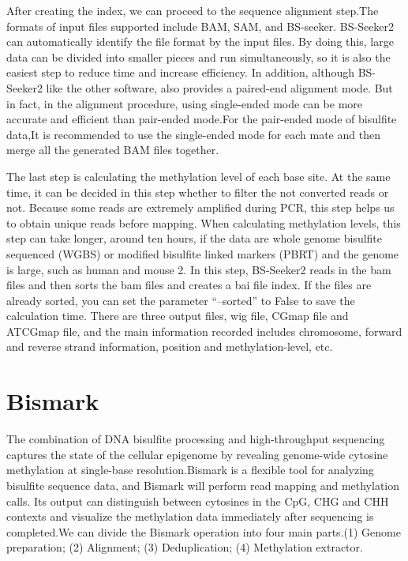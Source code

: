 \documentclass{PHlab-thesis}
\begin{document}
\par
After creating the index, we can proceed to the sequence alignment step.The formats of input files supported include BAM, SAM, and BS-seeker. BS-Seeker2 can automatically identify the file format by the input files. By doing this, large data can be divided into smaller pieces and run simultaneously, so it is also the easiest step to reduce time and increase efficiency. In addition, although BS-Seeker2 like the other software, also provides a paired-end alignment mode. But in fact, in the alignment procedure, using single-ended mode can be more accurate and efficient than pair-ended mode.For the pair-ended mode of bisulfite data,It is recommended to use the single-ended mode for each mate and then merge all the generated BAM files together.

\par
The last step is calculating the methylation level of each base site. At the same time, it can be decided in this step whether to filter the not converted reads or not. Because some reads are extremely amplified during PCR, this step helps us to obtain unique reads before mapping. When calculating methylation levels, this step can take longer, around ten hours, if the data are whole genome bisulfite sequenced (WGBS) or modified bisulfite linked markers (PBRT) and the genome is large, such as human and mouse {2}. In this step, BS-Seeker2 reads in the bam files and then sorts the bam files and creates a bai file index. If the files are already sorted, you can set the parameter “–sorted” to False to save the calculation time. There are three output files, wig file, CGmap file and ATCGmap file, and the main information recorded includes chromosome, forward and reverse strand information, position and methylation-level, etc.

\section{Bismark}
The combination of DNA bisulfite processing and high-throughput sequencing captures the state of the cellular epigenome by revealing genome-wide cytosine methylation at single-base resolution.Bismark is a flexible tool for analyzing bisulfite sequence data, and Bismark will perform read mapping and methylation calls. Its output can distinguish between cytosines in the CpG, CHG and CHH contexts and visualize the methylation data immediately after sequencing is completed.We can divide the Bismark operation into four main parts.(1) Genome preparation; (2) Alignment; (3) Deduplication; (4) Methylation extractor.
\end{document}
